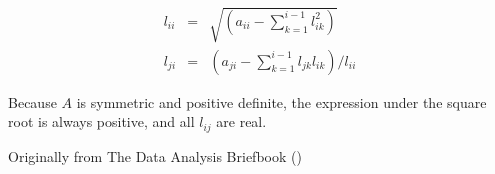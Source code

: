 \documentclass{article}
\begin{document}
\begin{eqnarray*}
 l_{ii} & = & \sqrt{\left( a_{ii} - \sum_{k=1}^{i-1} l_{ik}^2 \right)} \\
 l_{ji} & = & \left(a_{ji} - \sum_{k=1}^{i-1} l_{jk} l_{ik} \right) / l_{ii}
\end{eqnarray*}

Because $A$ is symmetric and positive definite, the expression under the square root is always positive, and all $l_{ij}$ are real. 

\begin{thebibliography}{3}

 Originally from The Data Analysis Briefbook
()

\end{thebibliography}
\end{document}
